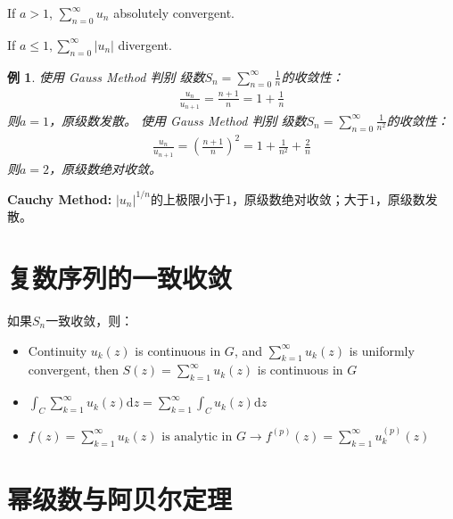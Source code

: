 \documentclass[10pt, a4paper, oneside]{ctexbook}
\newtheorem{example}[theorem]{例}
\def\D{\mathrm{d}}
\begin{document}
If $a>1$, $\displaystyle \sum_{n=0}^{\infty} u_{n}$ absolutely convergent.

If $\displaystyle a \leq 1, \sum_{n=0}^{\infty}\left|u_{n}\right|$ divergent.

\begin{example}
    使用 {\rm Gauss Method} 判别 级数$\displaystyle S_n=\sum_{n=0}^\infty \frac{1}{n}$的收敛性：
    \begin{align*}
        \frac{u_n}{u_{n+1}}=\frac{n+1}{n}=1+\frac{1}{n}
    \end{align*}
    则$a=1$，原级数发散。
    \newline
    使用 {\rm Gauss Method} 判别 级数$\displaystyle S_n=\sum_{n=0}^\infty \frac{1}{n^2}$的收敛性：
    \begin{align*}
        \frac{u_n}{u_{n+1}}=\left(\frac{n+1}{n}\right)^2=1+\frac{1}{n^2}+\frac{2}{n}
    \end{align*}
    则$a=2$，原级数绝对收敛。
\end{example}

\textbf{Cauchy Method: }$\displaystyle |u_n|^{1/n}$的上极限小于$1$，原级数绝对收敛；大于$1$，原级数发散。

\section{复数序列的一致收敛}

如果$S_n$一致收敛，则：
\begin{itemize}
    \item Continuity $u_{k}(z)$ is continuous in $G$, and $\sum_{k=1}^{\infty} u_{k}(z)$ is uniformly convergent, then $S(z)=\sum_{k=1}^{\infty} u_{k}(z)$ is continuous in $G$
    \item $\displaystyle
              \int_{C} \sum_{k=1}^{\infty} u_{k}(z) \D z=\sum_{k=1}^{\infty} \int_{C} u_{k}(z) \D z
          $
    \item $\displaystyle
              f(z)=\sum_{k=1}^{\infty} u_{k}(z) \text { is analytic in } G \to
              f^{(p)}(z)=\sum_{k=1}^{\infty} u_{k}^{(p)}(z)
          $
\end{itemize}

\section{幂级数与阿贝尔定理}
\end{document}

